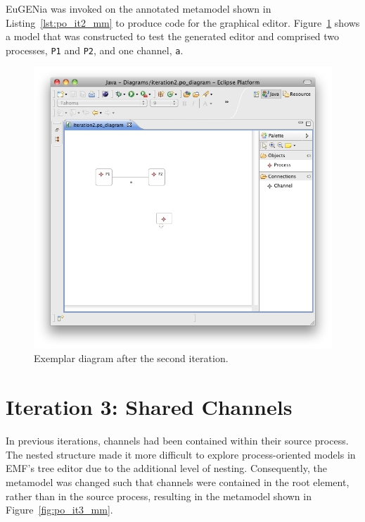 EuGENia was invoked on the annotated metamodel shown in Listing~\ref{lst:po_it2_mm} to produce code for the graphical editor. Figure~\ref{fig:po_it2_model} shows a model that was constructed to test the generated editor and comprised two processes, \texttt{P1} and \texttt{P2}, and one channel, \texttt{a}.

\begin{figure}[htbp]
	\centering
		\includegraphics[scale=0.5]{A.2.ProcessOriented/images/2_model.png}
	\caption{Exemplar diagram after the second iteration.}
	\label{fig:po_it2_model}
\end{figure}

\section{Iteration 3: Shared Channels}
In previous iterations, channels had been contained within their source process. The nested structure made it more difficult to explore process-oriented models in EMF's tree editor due to the additional level of nesting. Consequently, the metamodel was changed such that channels were contained in the root element, rather than in the source process, resulting in the metamodel shown in Figure~\ref{fig:po_it3_mm}.

